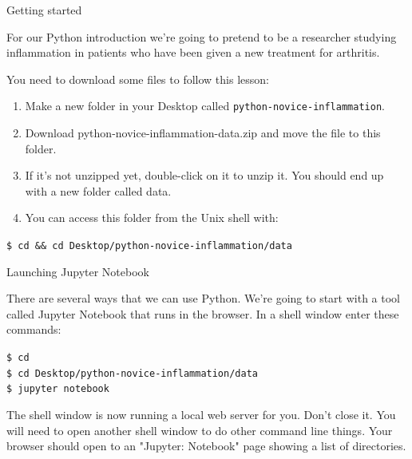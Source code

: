 \documentclass{beamer}
\begin{document}
\begin{frame}{Getting started}

\small{For our Python introduction we're going to pretend to be a researcher studying inflammation in patients who have been given a new treatment for arthritis.}
\vspace{0.5cm}

You need to download some files to follow this lesson:
\begin{enumerate}
 \item{Make a new folder in your Desktop called \texttt{python-novice-inflammation}.}
    \item{Download python-novice-inflammation-data.zip and move the file to this folder.}
    \item{If it's not unzipped yet, double-click on it to unzip it. You should end up with a new folder called data.}
   \item{You can access this folder from the Unix shell with:}
\end{enumerate}
\texttt{\$ cd \&\& cd Desktop/python-novice-inflammation/data}




\end{frame}


\begin{frame}{Launching Jupyter Notebook}

\small{There are several ways that we can use Python.  We're going to start with
a tool called Jupyter Notebook that runs in the browser.
In a shell window enter these commands:}

\vspace{0.5cm}

\begin{beamerboxesrounded}[upper=uppercolgreen,lower=lowercolgreen,shadow=false]{}
\texttt{\$ cd \\
\$ cd Desktop/python-novice-inflammation/data \\
\$ jupyter notebook}
\end{beamerboxesrounded}
\vspace{0.5cm}

\small{The shell window is now running a local web server for you.  Don't close it. You will need to open another shell window to do other command line things. Your browser should open to an "Jupyter:  Notebook" page showing a list of directories.}
\end{frame}
\end{document}
